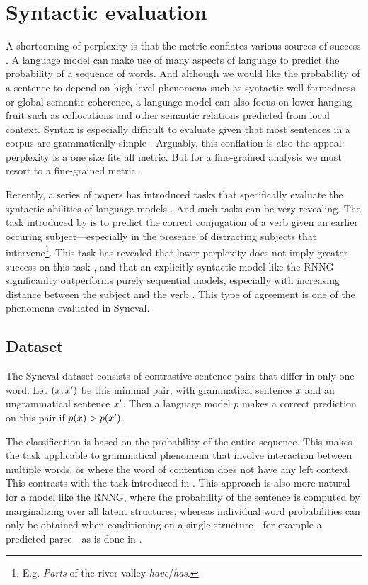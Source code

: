 \section{Syntactic evaluation}
  A shortcoming of perplexity is that the metric conflates various sources of success \citep{linzen2018targeted}. A language model can make use of many aspects of language to predict the probability of a sequence of words. And although we would like the probability of a sentence to depend on high-level phenomena such as syntactic well-formedness or global semantic coherence, a language model can also focus on lower hanging fruit such as collocations and other semantic relations predicted from local context. Syntax is especially difficult to evaluate given that most sentences in a corpus are grammatically simple \citep{linzen2018targeted}. Arguably, this conflation is also the appeal: perplexity is a one size fits all metric. But for a fine-grained analysis we must resort to a fine-grained metric.

  Recently, a series of papers has introduced tasks that specifically evaluate the syntactic abilities of language models \citep{linzen2016syntax,gulordava2018colorless,linzen2018targeted}. And such tasks can be very revealing. The task introduced by \citet{linzen2016syntax} is to predict the correct conjugation of a verb given an earlier occuring subject---especially in the presence of distracting subjects that intervene\footnote{E.g. \textit{Parts} of the river valley \textit{have}/\textit{has}.}. This task has revealed that lower perplexity does not imply greater success on this task \citep{tran2018recurrent}, and that an explicitly syntactic model like the RNNG significanlty outperforms purely sequential models, especially with increasing distance between the subject and the verb \citep{kuncoro2018learn}. This type of agreement is one of the phenomena evaluated in Syneval.

  \subsection{Dataset}
    The Syneval dataset consists of contrastive sentence pairs that differ in only one word. Let $(x, x')$ be this minimal pair, with grammatical sentence $x$ and an ungrammatical sentence $x'$. Then a language model $p$ makes a correct prediction on this pair if $p(x) > p(x')$.

    The classification is based on the probability of the entire sequence. This makes the task applicable to grammatical phenomena that involve interaction between multiple words, or where the word of contention does not have any left context. This contrasts with the task introduced in \citet{linzen2016syntax}. This approach is also more natural for a model like the RNNG, where the probability of the sentence is computed by marginalizing over all latent structures, whereas individual word probabilities can only be obtained when conditioning on a single structure---for example a predicted parse---as is done in \cite{kuncoro2018learn}.


